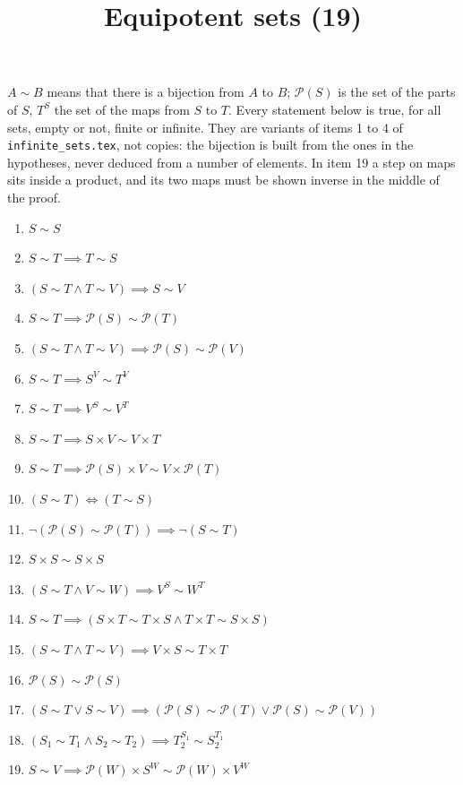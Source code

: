 \documentclass[11pt,a4paper]{article}
\title{Equipotent sets (19)}
\author{}
\date{}
\begin{document}
\maketitle
$A \sim B$ means that there is a bijection from $A$ to $B$; $\mathcal{P}(S)$ is the set of the parts of $S$, $T^{S}$ the set of the maps from $S$ to $T$. Every statement below is true, for all sets, empty or not, finite or infinite. They are variants of items 1 to 4 of \texttt{infinite\_sets.tex}, not copies: the bijection is built from the ones in the hypotheses, never deduced from a number of elements. In item 19 a step on maps sits inside a product, and its two maps must be shown inverse in the middle of the proof.

\begin{enumerate}
\item $\displaystyle S \sim S$
\item $\displaystyle S \sim T \implies T \sim S$
\item $\displaystyle (S \sim T \land T \sim V) \implies S \sim V$
\item $\displaystyle S \sim T \implies \mathcal{P}(S) \sim \mathcal{P}(T)$
\item $\displaystyle (S \sim T \land T \sim V) \implies \mathcal{P}(S) \sim \mathcal{P}(V)$
\item $\displaystyle S \sim T \implies S^{V} \sim T^{V}$
\item $\displaystyle S \sim T \implies V^{S} \sim V^{T}$
\item $\displaystyle S \sim T \implies S \times V \sim V \times T$
\item $\displaystyle S \sim T \implies \mathcal{P}(S) \times V \sim V \times \mathcal{P}(T)$
\item $\displaystyle (S \sim T) \iff (T \sim S)$
\item $\displaystyle \lnot (\mathcal{P}(S) \sim \mathcal{P}(T)) \implies \lnot (S \sim T)$
\item $\displaystyle S \times S \sim S \times S$
\item $\displaystyle (S \sim T \land V \sim W) \implies V^{S} \sim W^{T}$
\item $\displaystyle S \sim T \implies (S \times T \sim T \times S \land T \times T \sim S \times S)$
\item $\displaystyle (S \sim T \land T \sim V) \implies V \times S \sim T \times T$
\item $\displaystyle \mathcal{P}(S) \sim \mathcal{P}(S)$
\item $\displaystyle (S \sim T \lor S \sim V) \implies (\mathcal{P}(S) \sim \mathcal{P}(T) \lor \mathcal{P}(S) \sim \mathcal{P}(V))$
\item $\displaystyle (S_{1} \sim T_{1} \land S_{2} \sim T_{2}) \implies T_{2}^{S_{1}} \sim S_{2}^{T_{1}}$
\item $\displaystyle S \sim V \implies \mathcal{P}(W) \times S^{W} \sim \mathcal{P}(W) \times V^{W}$
\end{enumerate}
\end{document}
